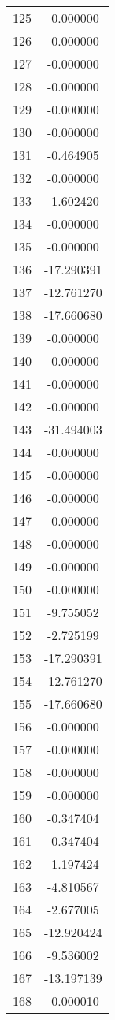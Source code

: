 \documentclass[12pt]{article}
\begin{document}
\begin{longtable}{@{}cc@{}}
125 & -0.000000 \\
126 & -0.000000 \\
127 & -0.000000 \\
128 & -0.000000 \\
129 & -0.000000 \\
130 & -0.000000 \\
131 & -0.464905 \\
132 & -0.000000 \\
133 & -1.602420 \\
134 & -0.000000 \\
135 & -0.000000 \\
136 & -17.290391 \\
137 & -12.761270 \\
138 & -17.660680 \\
139 & -0.000000 \\
140 & -0.000000 \\
141 & -0.000000 \\
142 & -0.000000 \\
143 & -31.494003 \\
144 & -0.000000 \\
145 & -0.000000 \\
146 & -0.000000 \\
147 & -0.000000 \\
148 & -0.000000 \\
149 & -0.000000 \\
150 & -0.000000 \\
151 & -9.755052 \\
152 & -2.725199 \\
153 & -17.290391 \\
154 & -12.761270 \\
155 & -17.660680 \\
156 & -0.000000 \\
157 & -0.000000 \\
158 & -0.000000 \\
159 & -0.000000 \\
160 & -0.347404 \\
161 & -0.347404 \\
162 & -1.197424 \\
163 & -4.810567 \\
164 & -2.677005 \\
165 & -12.920424 \\
166 & -9.536002 \\
167 & -13.197139 \\
168 & -0.000010 \\

\end{longtable}
\end{document}
